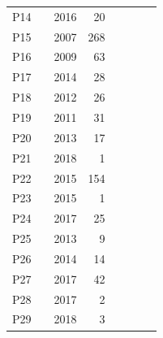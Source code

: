 \documentclass[manuscript,screen]{acmart}
\begin{document}
\begin{table}[]
\begin{tabular}{llrrcccl}
P14   &  \citet{liang2016barehanded}        & 2016 & 20         &                  &       &            &               \\
P15   & \citet{schmalstieg2007experiences}  & 2007 & 268        &                  &       &            &               \\
P16   & \citet{correa2009computer}          & 2009 & 63         &                  &       &            &               \\
P17   & \citet{xiao2014andante}             & 2014 & 28         &                  &       &            &               \\
P18   & \citet{takegawa2012piano}           & 2012 & 26         &                  &       &            &               \\
P19   & \citet{xiao2010mirrorfugue}         & 2011 & 31         &                  &       &            &               \\
P20   & \citet{xiao2013mirrorfugue}         & 2013 & 17         &                  &       &            &               \\
P21   & \citet{li2018application}           & 2018 & 1          &                  &       &            &               \\
P22   & \citet{wei2015teaching}             & 2015 & 154        &                  &       &            &               \\
P23   & \citet{zaqout2015augmented}         & 2015 & 1          &                  &       &            &               \\
P24   & \citet{serafin2017considerations}   & 2017 & 25         &                  &       &            &               \\
P25   & \citet{leonard2013virtual}          & 2013 & 9          &                  &       &            &               \\
P26   & \citet{raymaekers2014game}          & 2014 & 14         &                  &       &            &               \\
P27   & \citet{rogers2014piano}             & 2017 & 42         &                  &       &            &               \\
P28   & \citet{birhanu2017keynvision}       & 2017 & 2          &                  &       &            &               \\
P29   & \citet{sun2018mr}                   & 2018 & 3          &                  &       &            &               \\

\end{tabular}
\end{table}
\end{document}
